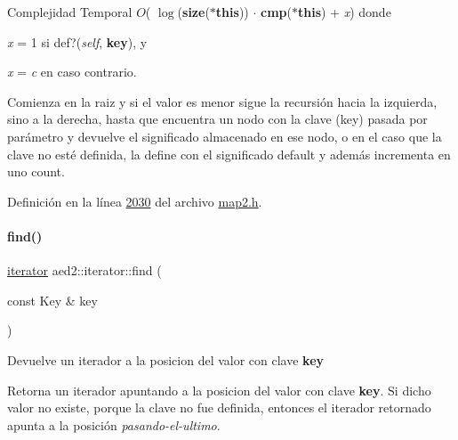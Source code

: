 \begin{DoxyDescription}
\item[Complejidad Temporal]$O$( $\log$({\bfseries size}({\bfseries $\ast$this})) $\cdot$ {\bfseries cmp}({\bfseries $\ast$this}) + {\itshape x}) donde
\begin{DoxyItemize}
\item {\itshape x} = 1 si def?({\itshape self}, {\bfseries key}), y
\item {\itshape x} = {\itshape c} en caso contrario.
\end{DoxyItemize}
\end{DoxyDescription}Comienza en la raiz y si el valor es menor sigue la recursión hacia la izquierda, sino a la derecha, hasta que encuentra un nodo con la clave (key) pasada por parámetro y devuelve el significado almacenado en ese nodo, o en el caso que la clave no esté definida, la define con el significado default y además incrementa en uno count. 

Definición en la línea \hyperlink{map2_8h_source_l02030}{2030} del archivo \hyperlink{map2_8h_source}{map2.\+h}.

\mbox{\label{classaed2_1_1iterator_a3d87256cbfc935a932677092ec57f49a_a3d87256cbfc935a932677092ec57f49a}} 
\paragraph{\texorpdfstring{find()}{find()}\hspace{0.1cm}{\footnotesize\ttfamily [1/2]}}
{\footnotesize\ttfamily \hyperlink{classaed2_1_1iterator_1_1iterator}{iterator} aed2\+::iterator\+::find (\begin{DoxyParamCaption}\item[{const Key \&}]{key }\end{DoxyParamCaption})\hspace{0.3cm}{\ttfamily [inline]}}



Devuelve un iterador a la posicion del valor con clave {\bfseries key} 

Retorna un iterador apuntando a la posicion del valor con clave {\bfseries key}. Si dicho valor no existe, porque la clave no fue definida, entonces el iterador retornado apunta a la posición {\itshape pasando-\/el-\/ultimo}.


